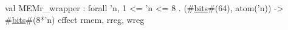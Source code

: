 val MEMr_wrapper : forall 'n, 1 <= 'n <= 8 . (#\hyperref[zbits]{bits}#(64), atom('n)) -> #\hyperref[zbits]{bits}#(8*'n) effect {rmem, rreg, wreg}
